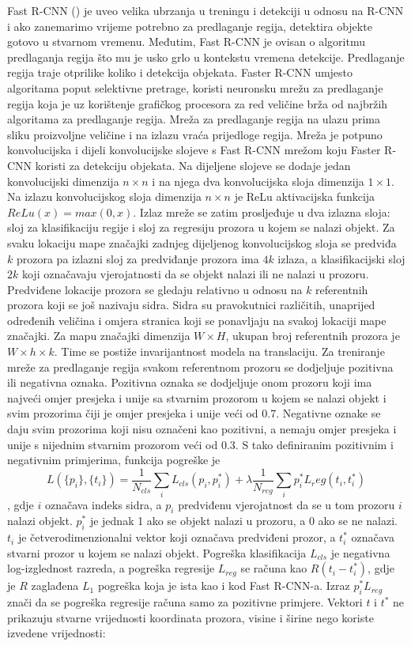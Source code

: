 Fast R-CNN (\cite{NIPS2015_5638}) je uveo velika ubrzanja u treningu i detekciji u odnosu na R-CNN i ako zanemarimo vrijeme potrebno za predlaganje regija, detektira objekte gotovo u stvarnom vremenu. Međutim, Fast R-CNN je ovisan o algoritmu predlaganja regija što mu je usko grlo u kontekstu vremena detekcije. Predlaganje regija traje otprilike koliko i detekcija objekata.
Faster R-CNN umjesto algoritama poput selektivne pretrage, koristi neuronsku mrežu za predlaganje regija koja je uz korištenje grafičkog procesora za red veličine brža od najbržih algoritama za predlaganje regija.
Mreža za predlaganje regija na ulazu prima sliku proizvoljne veličine i na izlazu vraća prijedloge regija. Mreža je potpuno konvolucijska i dijeli konvolucijske slojeve s Fast R-CNN mrežom koju Faster R-CNN koristi za detekciju objekata. Na dijeljene slojeve se dodaje jedan konvolucijski dimenzija $n \times n$ i na njega dva konvolucijska sloja dimenzija $1 \times 1$. Na izlazu konvolucijskog sloja dimenzija $n \times n$ je ReLu aktivacijska funkcija $ReLu(x) = max(0, x)$. Izlaz mreže se zatim prosljeđuje u dva izlazna sloja: sloj za klasifikaciju regije i sloj za regresiju prozora u kojem se nalazi objekt. 
Za svaku lokaciju mape značajki zadnjeg dijeljenog konvolucijskog sloja se predviđa $k$ prozora pa izlazni sloj za predviđanje prozora ima $4k$ izlaza, a klasifikacijski sloj $2k$ koji označavaju vjerojatnosti da se objekt nalazi ili ne nalazi u prozoru. Predviđene lokacije prozora se gledaju relativno u odnosu na $k$ referentnih prozora koji se još nazivaju sidra. Sidra su pravokutnici različitih, unaprijed određenih veličina i omjera stranica koji se ponavljaju na svakoj lokaciji mape značajki. Za mapu značajki dimenzija $W \times H$, ukupan broj referentnih prozora je $W \times h \times k$. Time se postiže invarijantnost modela na translaciju.
Za treniranje mreže za predlaganje regija svakom referentnom prozoru se dodjeljuje pozitivna ili negativna oznaka. Pozitivna oznaka se dodjeljuje onom prozoru koji ima najveći omjer presjeka i unije sa stvarnim prozorom u kojem se nalazi objekt i svim prozorima čiji je omjer presjeka i unije veći od 0.7. Negativne oznake se daju svim prozorima koji nisu označeni kao pozitivni, a nemaju omjer presjeka i unije s nijednim stvarnim prozorom veći od 0.3.
S tako definiranim pozitivnim i negativnim primjerima, funkcija pogreške je 
\[
	L(\{p_i\}, \{t_i\}) = \frac{1}{N_{cls}} \sum\limits_i L_{cls}(p_i, p_i^*) + \lambda \frac{1}{N_{reg}} \sum\limits_i p_i^* L_reg(t_i, t_i^*)
\]
, gdje $i$ označava indeks sidra, a $p_i$ predviđenu vjerojatnost da se u tom prozoru $i$ nalazi objekt. $p_i^*$ je jednak 1 ako se objekt nalazi u prozoru, a 0 ako se ne nalazi. $t_i$ je četverodimenzionalni vektor koji označava predviđeni prozor, a $t_i^*$ označava stvarni prozor u kojem se nalazi objekt. Pogreška klasifikacija $L_{cls}$ je negativna log-izglednost razreda, a pogreška regresije $L_{reg}$ se računa kao $R(t_i - t_i^*)$, gdje je $R$ zaglađena $L_1$ pogreška koja je ista kao i kod Fast R-CNN-a. Izraz $p_i^*L_{reg}$ znači da se pogreška regresije računa samo za pozitivne primjere. Vektori $t$ i $t^*$ ne prikazuju stvarne vrijednosti koordinata prozora, visine i širine nego koriste izvedene vrijednosti:
